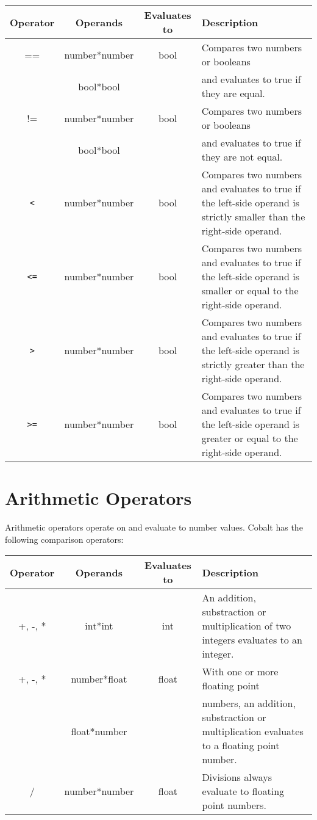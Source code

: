 \documentclass[a4paper,appendixprefix]{scrreprt}
\begin{document}
\begin{center}
  \begin{tabularx}{\textwidth}{|c|c|c|X|}
    \hline
    \textbf{Operator} & \textbf{Operands} & \textbf{Evaluates to} & \textbf{Description} \\ \hline
    == & number*number & bool & Compares two numbers or booleans \\
    & bool*bool & & and evaluates to true if they are equal. \\ \hline
    != & number*number & bool & Compares two numbers or booleans \\
    & bool*bool & & and evaluates to true if they are not equal. \\ \hline
    \verb|<| & number*number & bool & Compares two numbers and evaluates to true if the left-side operand is strictly smaller than the right-side operand. \\ \hline
    \verb|<=| & number*number & bool & Compares two numbers and evaluates to true if the left-side operand is smaller or equal to the right-side operand. \\ \hline
    \verb|>| & number*number & bool & Compares two numbers and evaluates to true if the left-side operand is strictly greater than the right-side operand. \\ \hline
    \verb|>=| & number*number & bool & Compares two numbers and evaluates to true if the left-side operand is greater or equal to the right-side operand. \\ \hline
  \end{tabularx}
\end{center}

\pagebreak

\section{Arithmetic Operators}
Arithmetic operators operate on and evaluate to number values. Cobalt has the following comparison operators:

\begin{center}
  \begin{tabularx}{\textwidth}{|c|c|c|X|}
    \hline
    \textbf{Operator} & \textbf{Operands} & \textbf{Evaluates to} & \textbf{Description} \\ \hline
    +, -, * & int*int & int & An addition, substraction or multiplication of two integers evaluates to an integer. \\ \hline
    +, -, * & number*float & float & With one or more floating point \\
      & float*number & & numbers, an addition, substraction or multiplication evaluates to a floating point number. \\ \hline
    / & number*number & float & Divisions always evaluate to floating point numbers. \\ \hline
  \end{tabularx}
\end{center}
\end{document}
